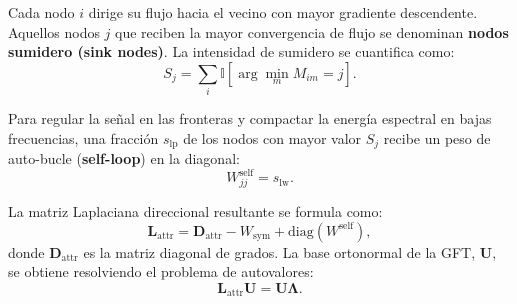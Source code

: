 \documentclass[11pt,a4paper]{article}
\begin{document}
Cada nodo $i$ dirige su flujo hacia el vecino con mayor gradiente descendente. Aquellos nodos $j$ que reciben la mayor convergencia de flujo se denominan \textbf{nodos sumidero (sink nodes)}. La intensidad de sumidero se cuantifica como:
\begin{equation}
  S_j = \sum_{i} \mathbb{I}\left[\arg\min_m M_{im} = j\right].
\end{equation}

Para regular la señal en las fronteras y compactar la energía espectral en bajas frecuencias, una fracción $s_{\text{lp}}$ de los nodos con mayor valor $S_j$ recibe un peso de auto-bucle (\textbf{self-loop}) en la diagonal:
\begin{equation}
  W_{jj}^{\text{self}} = s_{\text{lw}}.
\end{equation}

La matriz Laplaciana direccional resultante se formula como:
\begin{equation}
  \mathbf{L}_{\text{attr}} = \mathbf{D}_{\text{attr}} - W_{\text{sym}} + \mathrm{diag}(W^{\text{self}}),
\end{equation}
donde $\mathbf{D}_{\text{attr}}$ es la matriz diagonal de grados. La base ortonormal de la GFT, $\mathbf{U}$, se obtiene resolviendo el problema de autovalores:
\begin{equation}
  \mathbf{L}_{\text{attr}} \mathbf{U} = \mathbf{U} \mathbf{\Lambda}.
\end{equation}
\end{document}
